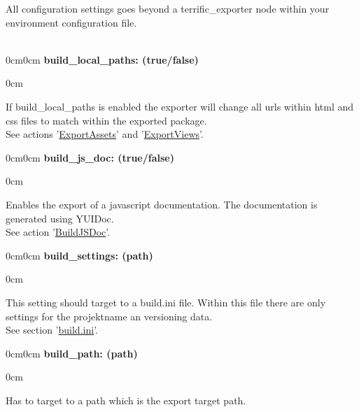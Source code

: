 
\newcommand{\optiondesc}[2]{
	\noindent
	\begin{minipage}{\textwidth}
	\vspace{1em}
	\begin{adjustwidth}{0cm}{0cm}
		\noindent \textbf{#1}\\
		\vspace{-1em}
		\begin{adjustwidth}{\parindent}{0cm}
			#2
		\end{adjustwidth}
	\end{adjustwidth}
	\end{minipage}
}

All configuration settings goes beyond a terrific\_exporter node within your environment configuration file.\\
\\
\optiondesc{build\_local\_paths: (true/false)}{
	If build\_local\_paths is enabled the exporter will change all urls within html and css files to match within the exported package.
	\\See actions '\hyperlink{sec-Actions-ExportAssets}{ExportAssets}' and '\hyperlink{sec-Actions-ExportViews}{ExportViews}'.\\
}

\optiondesc{build\_js\_doc: (true/false)}{
	Enables the export of a javascript documentation. The documentation is generated using YUIDoc.
	\\See action '\hyperlink{sec-Actions-BuildJSDoc}{BuildJSDoc}'.\\
}

\optiondesc{build\_settings: (path)}{
	This setting should target to a build.ini file. Within this file there are only settings for the projektname an versioning data.
	\\See section '\hyperlink{sec-build.ini}{build.ini}'.\\
}

\optiondesc{build\_path: (path)}{
	Has to target to a path which is the export target path.\\
}

